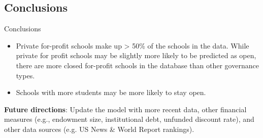 \documentclass{beamer}
\begin{document}
\subsection{Conclusions}
\begin{frame}{Conclusions}
\begin{itemize}

\item Private for-profit schools make up > 50\% of the schools in the data. While private for profit schools may be slightly more likely to be predicted as open, there are more closed for-profit schools in the database than other governance types.
\item Schools with more students may be more likely to stay open.
\end{itemize}

\textbf{Future directions}: Update the model with more recent data, other financial measures (e.g., endowment size, institutional debt, unfunded discount rate), and other data sources (e.g. US News \& World Report rankings).

\end{frame}
\end{document}
